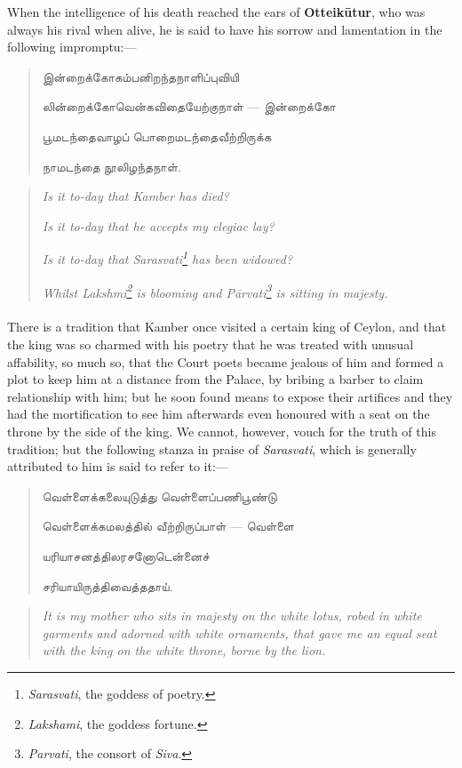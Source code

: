 \documentclass{article}
\newcommand{\TamilText}[1]{\texttamil{#1}}
\newcommand{\tam}[1]{\TamilText{#1}}
\begin{document}
When the intelligence of his death reached the ears of \textbf{Otteik\={u}tur}, who was always his rival when alive, he is said to have his sorrow and lamentation in the following impromptu:---
\begin{quotation}\small
\tam{இன்றைக்கோகம்பனிறந்தநாளிப்புவியி}

\tam{லின்றைக்கோவென்கவிதையேற்குநாள்‌} --- \tam{இன்றைக்கோ}

\tam{பூமடந்தைவாழப்‌ பொறைமடந்தைவீற்றிருக்க}

\tam{நாமடந்தை நூலிழந்தநாள்‌}.
\end{quotation}
\begin{quotation}\small
\emph{Is it to-day that Kamber has died?}

\emph{Is it to-day that he accepts my elegiac lay?}

\emph{Is it to-day that Sarasvati\footnote{\emph{Sarasvati}, the goddess of poetry.} has been widowed?}

\emph{Whilst Lakshmi\footnote{\emph{Lakshami}, the goddess fortune.} is blooming and P\={a}rvati\footnote{\emph{Parvati}, the consort of \emph{Siva}.} is sitting in majesty.}
\end{quotation}
\paragraph{}
There is a tradition that Kamber once visited a certain king of Ceylon, and that the king was so charmed with his poetry that he was treated with unusual affability, so much so, that the Court poets became jealous of him and formed a plot to keep him at a distance from the Palace, by bribing a barber to claim relationship with him; but he soon found means to expose their artifices and they had the mortification to see him afterwards even honoured with a seat on the throne by the side of the king. We cannot, however, vouch for the truth of this tradition; but the following stanza in praise of \emph{Sarasvati}, which is generally attributed to him is said to refer to it:---
\begin{quotation}\small
\tam{வெள்ளைக்கலையுடுத்து வெள்ளைப்பணிபூண்டு}

\tam{வெள்ளைக்கமலத்தில்‌ வீற்றிருப்பாள்‌} --- \tam{வெள்ளை}

\tam{யரியாசனத்திலரசனோடென்னைச்‌}

\tam{சரியாயிருத்திவைத்ததாய்}.
\end{quotation}
\begin{quotation}\small
\emph{It is my mother who sits in majesty on the white lotus, robed in white garments and adorned with white ornaments, that gave me an equal seat with the king on the white throne, borne by the lion.}
\end{quotation}
\end{document}
